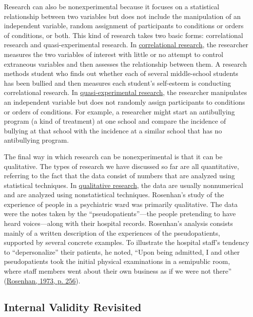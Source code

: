 \documentclass[
]{krantz}
\begin{document}
Research can also be nonexperimental because it focuses on a statistical relationship between two variables but does not include the manipulation of an independent variable, random assignment of participants to conditions or orders of conditions, or both. This kind of research takes two basic forms: correlational research and quasi-experimental research. In \protect\hyperlink{correlational-research-1}{correlational research}, the researcher measures the two variables of interest with little or no attempt to control extraneous variables and then assesses the relationship between them. A research methods student who finds out whether each of several middle-school students has been bullied and then measures each student's self-esteem is conducting correlational research. In \protect\hyperlink{quasi-experimental-research-1}{quasi-experimental research}, the researcher manipulates an independent variable but does not randomly assign participants to conditions or orders of conditions. For example, a researcher might start an antibullying program (a kind of treatment) at one school and compare the incidence of bullying at that school with the incidence at a similar school that has no antibullying program.

The final way in which research can be nonexperimental is that it can be qualitative. The types of research we have discussed so far are all quantitative, referring to the fact that the data consist of numbers that are analyzed using statistical techniques. In \protect\hyperlink{qualitative-research}{qualitative research}, the data are usually nonnumerical and are analyzed using nonstatistical techniques. Rosenhan's study of the experience of people in a psychiatric ward was primarily qualitative. The data were the notes taken by the ``pseudopatients''---the people pretending to have heard voices---along with their hospital records. Rosenhan's analysis consists mainly of a written description of the experiences of the pseudopatients, supported by several concrete examples. To illustrate the hospital staff's tendency to ``depersonalize'' their patients, he noted, ``Upon being admitted, I and other pseudopatients took the initial physical examinations in a semipublic room, where staff members went about their own business as if we were not there'' (\protect\hyperlink{ref-rosenhan1973being}{Rosenhan, 1973, p. 256}).

\hypertarget{internal-validity-revisited}{%
\subsection*{Internal Validity Revisited}\label{internal-validity-revisited}}
\end{document}
